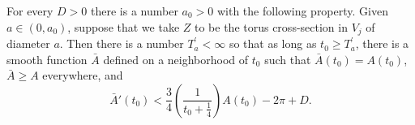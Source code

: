 \begin{lemma}
  \label{lem:kl-incompressibility-cuspidal-tori-existence-diameter}
 \label{lemsupport}
For every $D>0$ there is a number $a_0>0$ with the following property.
Given $a \in (0, a_0)$, suppose that we take $Z$ to be the torus
cross-section
in $V_j$
of diameter $a$. Then
there is a number $T^\prime_a < \infty$ so that as long as
$t_0\geq T^\prime_a$, there is a smooth function $\bar A$ defined
on a neighborhood of $t_0$ such that $\bar  A(t_0)=A(t_0)$, $\bar A\geq A$
everywhere, and
\begin{equation} \label{dereqn}
\bar A'(t_0)< \frac{3}{4}\left(\frac{1}{t_0+\frac14}\right) A(t_0)-2\pi+D.
\end{equation}
\end{lemma}
